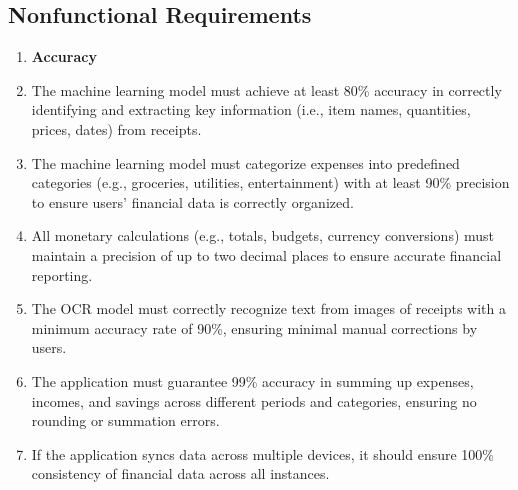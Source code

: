 \documentclass[12pt]{article}
\begin{document}
\subsection{Nonfunctional Requirements}
\begin{enumerate}[label=NFR\arabic*]
  \item[] \textbf{Accuracy}
  \item The machine learning model must achieve at least 80\% accuracy in
  correctly identifying and extracting key information (i.e., item names,
  quantities, prices, dates) from receipts.
  \item The machine learning model must categorize expenses into predefined
  categories (e.g., groceries, utilities, entertainment) with at least 90\%
  precision to ensure users' financial data is correctly organized.
  \item All monetary calculations (e.g., totals, budgets, currency conversions)
  must maintain a precision of up to two decimal places to ensure accurate
  financial reporting.
  \item The OCR model must correctly recognize text from images of receipts with
  a minimum accuracy rate of 90\%, ensuring minimal manual corrections by users.
  \item The application must guarantee 99\% accuracy in summing up expenses, incomes,
  and savings across different periods and categories, ensuring no rounding or
  summation errors.
  \item If the application syncs data across multiple devices, it should
  ensure 100\% consistency of financial data across all instances.


\end{enumerate}
\end{document}

